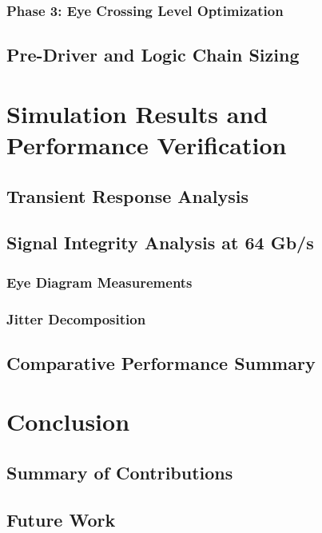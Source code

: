        \subsection{Phase 3: Eye Crossing Level Optimization}
    \section{Pre-Driver and Logic Chain Sizing}

\chapter{Simulation Results and Performance Verification}
    \section{Transient Response Analysis}
    \section{Signal Integrity Analysis at 64 Gb/s}
        \subsection{Eye Diagram Measurements}
        \subsection{Jitter Decomposition}
    \section{Comparative Performance Summary}

\chapter{Conclusion}
    \section{Summary of Contributions}
    \section{Future Work}